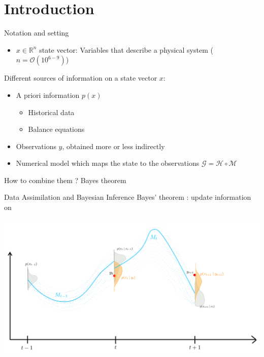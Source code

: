 \documentclass[10pt,aspectratio=169]{beamer}
\begin{document}
\section{Introduction}
\begin{frame}{Notation and setting}
\begin{itemize}
    \item $x \in \mathbb{R}^n$ state vector: Variables that describe a physical system ($n = \mathcal{O}(10^{6-9})$) 
\end{itemize}
    Different sources of information on a state vector $x$:
    \begin{itemize}
        \item A priori information $p(x)$
        \begin{itemize}
            \item Historical data
            \item Balance equations
        \end{itemize}
        \item Observations $y$, obtained more or less indirectly
        \item Numerical model which maps the state to the observations $\mathcal{G} = \mathcal{H} \circ \mathcal{M}$
    \end{itemize}
    How to combine them ? Bayes theorem
\end{frame}


\begin{frame}{Data Assimilation and Bayesian Inference}
Bayes' theorem : update information on  
\begin{center}
    \includegraphics[height=.6\textheight]{img/Bayes_DA.png}
\end{center}
\end{frame}
\end{document}
